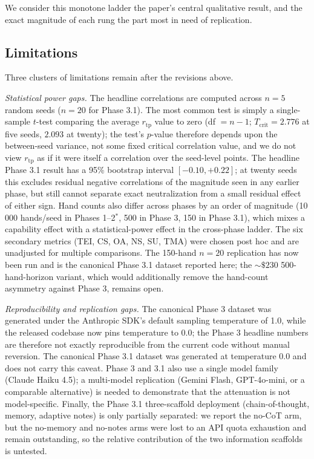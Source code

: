 \documentclass[10pt,twocolumn,letterpaper]{article}
\newcommand{\rtp}{\ensuremath{r_{\mathrm{tp}}}}
\begin{document}
We consider this monotone ladder the paper's central qualitative result, and
the exact magnitude of each rung the part most in need of replication.

\subsection{Limitations}
Three clusters of limitations remain after the revisions above.

\textit{Statistical power gaps.} The headline correlations are computed across $n = 5$ random seeds ($n = 20$ for Phase 3.1). The most common test is simply a single-sample $t$-test comparing the average $\rtp$ value to zero (df $= n-1$; $T_{\text{crit}} = 2.776$ at five seeds, $2.093$ at twenty); the test's
$p$-value therefore depends upon the between-seed variance, not some
fixed critical correlation value, and we do not view $\rtp$ as if it were itself a correlation over the seed-level points. The headline Phase 3.1 result has a 95\% bootstrap interval $[-0.10, +0.22]$; at twenty seeds this excludes residual negative correlations of the magnitude seen in any earlier phase, but still cannot separate exact neutralization from a small residual effect of either sign. Hand counts also differ across phases by an
order of magnitude (10\,000 hands/seed in Phases 1--2$^{*}$, 500
in Phase 3, 150 in Phase 3.1), which mixes a capability effect
with a statistical-power effect in the cross-phase ladder. The
six secondary metrics (TEI, CS, OA, NS, SU, TMA) were chosen
post hoc and are unadjusted for multiple comparisons. The 150-hand $n = 20$ replication has now been run and is the canonical Phase 3.1 dataset reported here; the ${\sim}\$230$ 500-hand-horizon variant, which would additionally remove the hand-count asymmetry against Phase 3, remains open.

\textit{Reproducibility and replication gaps.} The canonical Phase 3 dataset was generated under the Anthropic SDK's default sampling temperature of 1.0, while the released codebase now pins temperature to 0.0; the Phase 3 headline numbers are therefore not exactly reproducible from the current code without manual reversion. The canonical Phase 3.1 dataset was generated at temperature 0.0 and does not carry this caveat. Phase 3 and 3.1 also use a single model family
(Claude Haiku 4.5); a multi-model replication (Gemini Flash,
GPT-4o-mini, or a comparable alternative) is needed to
demonstrate that the attenuation is not model-specific. Finally,
the Phase 3.1 three-scaffold deployment (chain-of-thought, memory, adaptive notes) is only partially separated: we report the no-CoT arm, but the no-memory and no-notes arms were lost to an API quota exhaustion and remain outstanding, so the relative contribution of the two information scaffolds is untested.
\end{document}
